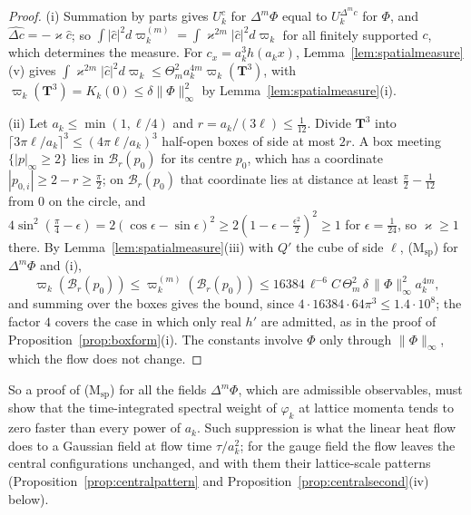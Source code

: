 \documentclass[aps,prd,twocolumn,superscriptaddress,nofootinbib,longbibliography,floatfix,amsmath,amssymb,10pt]{revtex4-2}
\theoremstyle{definition}
\theoremstyle{remark}
\begin{document}
\begin{proof}
(i) Summation by parts gives $U^c_k$ for $\Delta^m\Phi$ equal to
$U^{\Delta^mc}_k$ for $\Phi$, and $\widehat{\Delta c}=-\varkappa\hat c$; so
$\int|\hat c|^2d\varpi^{(m)}_k=\int\varkappa^{2m}|\hat c|^2d\varpi_k$ for all
finitely supported $c$, which determines the measure. For $c_x=a_k^3
h(a_kx)$, Lemma~\ref{lem:spatialmeasure}(v) gives
$\int\varkappa^{2m}|\hat c|^2d\varpi_k\le
\Theta_m^2a_k^{4m}\varpi_k(\mathbf T^3)$, with $\varpi_k(\mathbf T^3)=
K_k(0)\le\delta\|\Phi\|_\infty^2$ by Lemma~\ref{lem:spatialmeasure}(i).

(ii) Let $a_k\le\min(1,\ell/4)$ and $r=a_k/(3\ell)\le\frac1{12}$. Divide
$\mathbf T^3$ into $\lceil3\pi\ell/a_k\rceil^3\le(4\pi\ell/a_k)^3$
half-open boxes of side at most $2r$. A box meeting $\{|p|_\infty\ge2\}$
lies in $\mathcal B_r(p_0)$ for its centre $p_0$, which has a coordinate
$|p_{0,i}|\ge2-r\ge\frac\pi2$; on $\mathcal B_r(p_0)$ that coordinate lies
at distance at least $\frac\pi2-\frac1{12}$ from $0$ on the circle, and
$4\sin^2(\frac\pi4-\epsilon)=2(\cos\epsilon-\sin\epsilon)^2\ge2(1-\epsilon-
\frac{\epsilon^2}2)^2\ge1$ for $\epsilon=\frac1{24}$, so $\varkappa\ge1$
there. By
Lemma~\ref{lem:spatialmeasure}(iii) with $Q'$ the cube of side $\ell$,
(M$_{\mathrm{sp}}$) for $\Delta^m\Phi$ and (i),
\[
\varpi_k(\mathcal B_r(p_0))\le\varpi^{(m)}_k(\mathcal B_r(p_0))\le
16384\,\ell^{-6}C\,\Theta_m^2\,\delta\,\|\Phi\|_\infty^2a_k^{4m} ,
\]
and summing over the boxes gives the bound, since $4\cdot16384\cdot
64\pi^3\le1.4\cdot10^8$; the factor $4$ covers the case in which only real
$h'$ are admitted, as in the proof of Proposition~\ref{prop:boxform}(i). The constants involve $\Phi$ only through $\|\Phi\|_\infty$,
which the flow does not change.
\end{proof}

So a proof of (M$_{\mathrm{sp}}$) for all the fields $\Delta^m\Phi$, which
are admissible observables, must show that the time-integrated spectral
weight of $\varphi_k$ at lattice momenta tends to zero faster than every
power of $a_k$. Such suppression is what the linear heat flow does to a Gaussian field at
flow time $\tau/a_k^2$; for the gauge field the flow leaves the central
configurations unchanged, and with them their lattice-scale patterns
(Proposition~\ref{prop:centralpattern} and
Proposition~\ref{prop:centralsecond}(iv) below).
\end{document}
